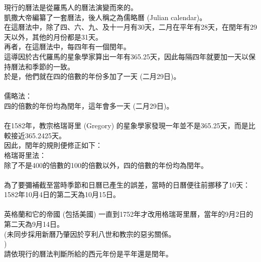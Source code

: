 現行的曆法是從羅馬人的曆法演變而來的。\\
凱撒大帝編纂了一套曆法，後人稱之為儒略曆 (Julian calendar)。\\
在這曆法中，除了四、六、九、及十一月有30天，二月在平年有28天，在閏年有29天以外，其他的月份都是31天。\\
再者，在這曆法中，每四年有一個閏年。\\
這導因於古代羅馬的星象學家算出一年有365.25天，因此每隔四年就要加一天以保持曆法和季節的一致。\\
於是，他們就在四的倍數的年份多加了一天 (二月29日)。\\
\\
儒略法：\\
四的倍數的年份均為閏年，這年會多一天 (二月29日)。\\
\\
在1582年，教宗格瑞哥里 (Gregory) 的星象學家發現一年並不是365.25天，而是比較接近365.2425天。\\
因此，閏年的規則便修正如下：\\
格瑞哥里法：\\
除了不是400的倍數的100的倍數以外，四的倍數的年份均為閏年。\\
\\
為了要彌補截至當時季節和日曆已產生的誤差，當時的日曆便往前挪移了10天：1582年10月4日的第二天為10月15日。\\
\\
英格蘭和它的帝國 (包括美國) 一直到1752年才改用格瑞哥里曆，當年的9月2日的第二天為9月14日。\\
(未同步採用新曆乃肇因於亨利八世和教宗的惡劣關係。\\
)\\
請依現行的曆法判斷所給的西元年份是平年還是閏年。\\
